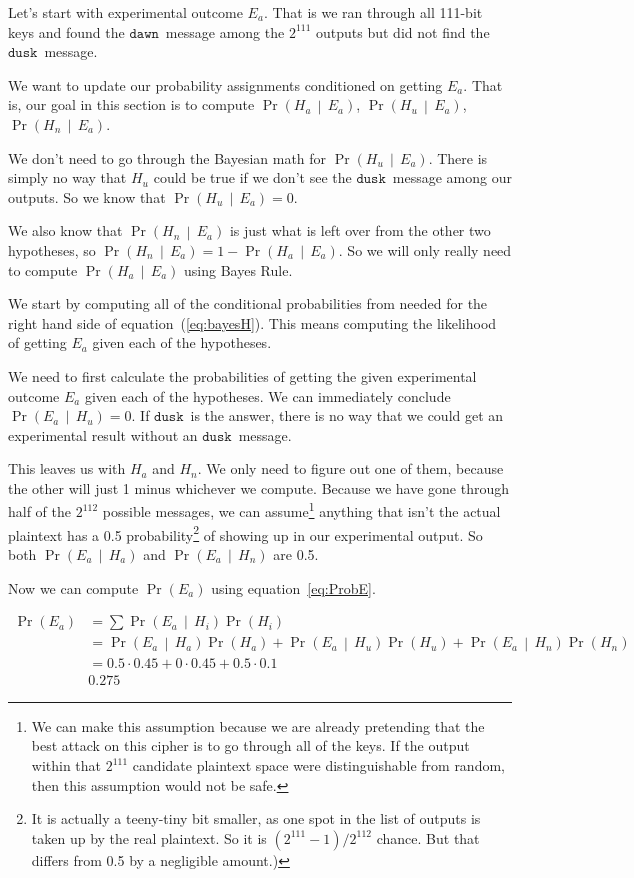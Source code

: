 \documentclass{article}
\newcommand{\prob}[1]{\ensuremath{\operatorname{Pr}\left( #1 \right)}}
\newcommand{\condprob}[2]{\prob{#1\, \middle|\, #2}}
\newcommand\mdusk{\ensuremath{\mathtt{dusk}}}
\newcommand\mdawn{\ensuremath{\mathtt{dawn}}}
\begin{document}
Let's start with experimental outcome $E_a$. That is we ran through all 111-bit keys and found the \mdawn\ message among the $2^{111}$ outputs but did not find the \mdusk\ message.

We want to update our probability assignments conditioned on getting $E_a$. That is, our goal in this section is to compute \condprob{H_a}{E_a}, \condprob{H_u}{E_a}, \condprob{H_n}{E_a}.

We don't need to go through the Bayesian math for \condprob{H_u}{E_a}.
There is simply no way that $H_u$ could be true if we don't see the \mdusk\ message among our outputs. So we know that $\condprob{H_u}{E_a} = 0$.

We also know that \condprob{H_n}{E_a} is just what is left over from the other two hypotheses, so $\condprob{H_n}{E_a} = 1 - \condprob{H_a}{E_a}$.
So we will only really need to compute \condprob{H_a}{E_a} using Bayes Rule.


We start by computing all of the conditional probabilities from needed for the right hand side of equation~(\ref{eq:bayesH}). This means computing the likelihood of getting $E_a$ given each of the hypotheses. 

We need to first calculate the probabilities of getting the given experimental outcome $E_a$ given each of the hypotheses.
We can immediately conclude $\condprob{E_a}{H_u} = 0$.
If \mdusk\ is the answer, there is no way that we could get an experimental result without an \mdusk\ message.

This leaves us with $H_a$ and $H_n$.
We only need to figure out one of them, because the other will just 1 minus whichever we compute.
Because we have gone through half of the $2^{112}$ possible messages,
we can assume\footnote{%
    We can make this assumption because we are already pretending that the best attack on this cipher is to go through all of the keys. If the output within that $2^{111}$ candidate plaintext space were distinguishable from random, then this assumption would not be safe.
}
anything that isn't the actual plaintext has a 0.5 probability\footnote{%
    It is actually a teeny-tiny bit smaller, as one spot in the list of outputs
    is taken up by the real plaintext. So it is $(2^{111}-1)/2^{112}$ chance.
    But that differs from 0.5 by a negligible amount.)
}
of showing up in our experimental output.
So both \condprob{E_a}{H_a} and \condprob{E_a}{H_n} are 0.5.

Now we can compute \prob{E_a} using equation~\ref{eq:ProbE}.

\begin{equation}
    \begin{split}
        \prob{E_a}  &= \sum \condprob{E_a}{H_i}\prob{H_i} \\
                    &= \condprob{E_a}{H_a}\prob{H_a}
                        + \condprob{E_a}{H_u}\prob{H_u}
                        + \condprob{E_a}{H_n}\prob{H_n} \\
                    &= 0.5 \cdot 0.45 + 0 \cdot 0.45 + 0.5 \cdot 0.1 \\
                    & 0.275
    \end{split}
\end{equation}
\end{document}
